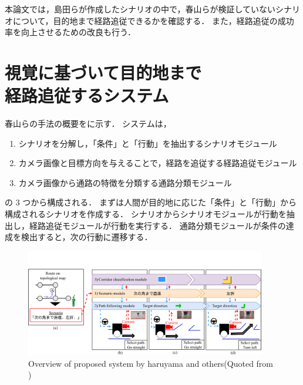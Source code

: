 \documentclass[10pt]{jarticle}
\begin{document}
    本論文では，島田らが作成したシナリオの中で，春山らが検証していないシナリオについて，目的地まで経路追従できるかを確認する．
    また，経路追従の成功率を向上させるための改良も行う．
    \section{視覚に基づいて目的地まで\\経路追従するシステム}
    春山らの手法\cite{haruyama2023}の概要をに示す．
    システムは，
    \begin{enumerate}
        \setlength{\parskip}{0cm} %
        \setlength{\itemsep}{0cm} %
        \item シナリオを分解し，「条件」と「行動」を抽出するシナリオモジュール
        \item カメラ画像と目標方向を与えることで，経路を追従する経路追従モジュール
        \item カメラ画像から通路の特徴を分類する通路分類モジュール
    \end{enumerate}
    の 3 つから構成される．
    まずは人間が目的地に応じた「条件」と「行動」から構成されるシナリオを作成する．
    シナリオからシナリオモジュールが行動を抽出し，経路追従モジュールが行動を実行する．
    通路分類モジュールが条件の達成を検出すると，次の行動に遷移する．
    \begin{figure}[t]
        \centering
        \vspace{-1.5zh}
        \includegraphics[width=105mm]{./fig/haruyama/system.pdf}
        \vspace{-1zh}
        \caption{Overview of proposed system by haruyama and others(Quoted from \cite{haruyama2023})}
        \label{fig:system}
    \end{figure}

\end{document}
